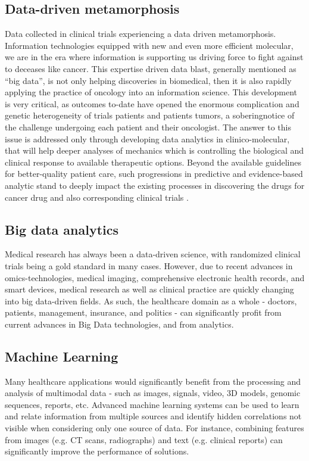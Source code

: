 \documentclass[sigconf]{acmart}
\begin{document}
\subsection{Data-driven metamorphosis}
Data collected in clinical trials experiencing a data driven
metamorphosis. Information technologies equipped with new
and even more efficient molecular, we are in the era where information
is supporting us driving force to fight against to deceases like cancer. 
This expertise driven data blast, generally mentioned as ``big data'', 
is not only helping discoveries in biomedical, then it is also rapidly 
applying the practice of oncology into an information science. This 
development is very critical, as outcomes to-date have opened the enormous
complication and genetic heterogeneity of trials patients and patients 
tumors, a soberingnotice of the challenge undergoing each patient and
their oncologist. The answer to this issue is addressed only through 
developing data analytics in clinico-molecular, that will help deeper
analyses of mechanics which is controlling the biological and clinical
response to available therapeutic options. Beyond the available 
guidelines for better-quality patient care, such progressions in 
predictive and evidence-based analytic stand to deeply impact the 
existing processes in discovering the drugs for cancer drug and also
corresponding clinical trials \cite{TR01}.

\subsection{Big data analytics}
Medical research has always been a data-driven science, with 
randomized clinical trials being a gold standard in many cases. 
However, due to recent advances in omics-technologies, medical 
imaging, comprehensive electronic health records, and smart devices,
medical research as well as clinical practice are quickly changing 
into big data-driven fields. As such, the healthcare domain as a 
whole - doctors, patients, management, insurance, and politics -
can significantly profit from current advances in Big Data 
technologies, and from analytics\cite{TR04}.
\subsection{Machine Learning}
Many healthcare applications would significantly benefit from the
processing and analysis of multimodal data - such as images, 
signals, video, 3D models, genomic sequences, reports, etc. 
Advanced machine learning systems can be used to learn and relate
information from multiple sources and identify hidden correlations 
not visible when considering only one source of data. For instance,
combining features from images (e.g. CT scans, radiographs) and text
(e.g. clinical reports) can significantly improve the performance 
of solutions\cite{TR04}.
\end{document}
